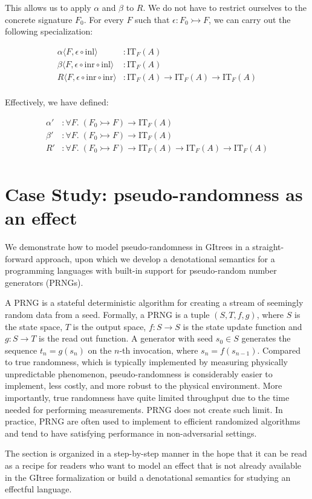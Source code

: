 \documentclass{article}
\theoremstyle{definition}
\theoremstyle{plain}
\theoremstyle{remark}
\newcommand{\subeff}{\rightarrowtail}
\newcommand{\inl}{\mathrm{inl}}
\newcommand{\inr}{\mathrm{inr}}
\newcommand{\IT}{\mathrm{IT}}
\begin{document}
This allows us to apply \(\alpha\) and \(\beta\) to \(R\).
We do not have to restrict ourselves to the concrete signature \(F_0\).
For every \(F\) such that \(\epsilon : F_0\subeff F\), we can carry out the following specialization:

\begin{align*}
  \alpha \langle F, \epsilon \circ \inl \rangle & : \IT_{F}(A) \\
  \beta \langle F, \epsilon \circ \inr \circ \inl \rangle & : \IT_{F}(A) \\
  R \langle F, \epsilon \circ \inr \circ \inr \rangle & : \IT_{F}(A) \to \IT_{F}(A) \to \IT_{F}(A) \\
\end{align*}

Effectively, we have defined:

\begin{align*}
  \alpha' &: \forall F .\; (F_0\subeff F) \to \IT_F(A) \\
  \beta' &: \forall F .\; (F_0\subeff F) \to \IT_F(A) \\
  R' &: \forall F .\; (F_0\subeff F) \to \IT_F(A) \to \IT_F(A) \to \IT_F(A) \\
\end{align*}

\section{Case Study: pseudo-randomness as an effect}

We demonstrate how to model pseudo-randomness in GItrees in a straight-forward approach,
upon which we develop a denotational semantics for a programming languages with built-in support for pseudo-random number generators (PRNGs).\par
A PRNG is a stateful deterministic algorithm for creating a stream of seemingly random data from a seed. Formally, a PRNG is a tuple \((S,T,f,g)\), where \(S\) is the state space, \(T\) is the output space, \(f : S \to S\) is the state update function and \(g : S \to T\) is the read out function. A generator with seed \(s_0 \in S\) generates the sequence \(t_n = g(s_n)\) on the \(n\)-th invocation, where \(s_n = f(s_{n-1})\).
Compared to true randomness, which is typically implemented by measuring physically unpredictable phenomenon, pseudo-randomness is considerably easier to implement, less costly, and more robust to the physical environment. More importantly, true randomness have quite limited throughput due to the time needed for performing measurements. PRNG does not create such limit. In practice, PRNG are often used to implement to efficient randomized algorithms and tend to have satisfying performance in non-adversarial settings.\par
The section is organized in a step-by-step manner in the hope that it can be read as a recipe for readers who want to model an effect that is not already available in the GItree formalization or build a denotational semantics for studying an effectful language.
\end{document}
